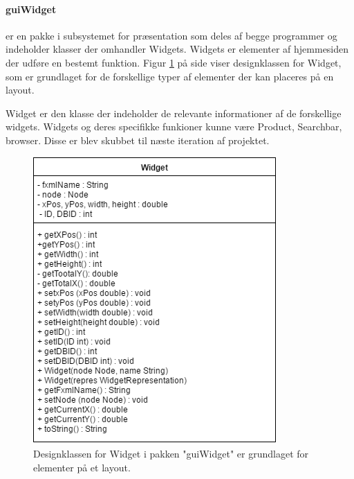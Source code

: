 \paragraph{guiWidget}er en pakke i subsystemet for præsentation som deles af begge programmer og indeholder klasser der omhandler Widgets. Widgets er elementer af hjemmesiden der udføre en bestemt funktion. Figur \ref{Designklasse-Widget} på side \pageref{Designklasse-Widget} viser designklassen for Widget, som er grundlaget for de forskellige typer af elementer der kan placeres på en layout.

Widget er den klasse der indeholder de relevante informationer af de forskellige widgets. Widgets og deres specifikke funkioner kunne være Product, Searchbar, browser. Disse er blev skubbet til næste iteration af projektet.
\begin{figure}[H]
      \includegraphics[width=\linewidth]{elaborationsdokumentet/figurer/design/designklasser/Designklasse-Widget.png}
      \caption{Designklassen for Widget i pakken "guiWidget" er grundlaget for elementer på et layout.}
      \label{Designklasse-Widget}
  \end{figure}

